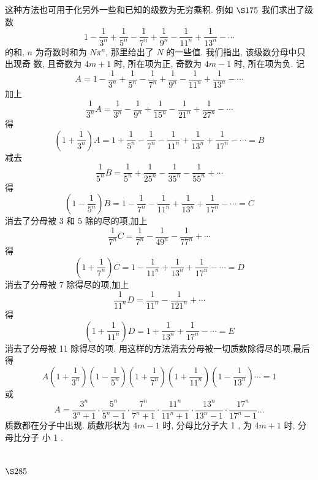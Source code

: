 这种方法也可用于化另外一些和已知的级数为无穷乘积. 例如 $\S 175$ 我们求出了级 数
\[
1-\frac{1}{3^{n}}+\frac{1}{5^{n}}-\frac{1}{7^{n}}+\frac{1}{9^{n}}-\frac{1}{11^{n}}+\frac{1}{13^{n}}-\cdots
\]
的和, $n$ 为奇数时和为 $N \pi^{n}$, 那里给出了 $N$ 的一些值. 我们指出, 该级数分母中只出现奇 数, 且奇数为 $4 m+1$ 时, 所在项为正, 奇数为 $4 m-1$ 时, 所在项为负. 记
\[
A=1-\frac{1}{3^{n}}+\frac{1}{5^{n}}-\frac{1}{7^{n}}+\frac{1}{9^{n}}-\frac{1}{11^{n}}+\frac{1}{13^{n}}-\cdots
\]
加上
\[
\frac{1}{3^{n}} A=\frac{1}{3^{n}}-\frac{1}{9^{n}}+\frac{1}{15^{n}}-\frac{1}{21^{n}}+\frac{1}{27^{n}}-\cdots
\]
得
\[
\left(1+\frac{1}{3^{n}}\right) A=1+\frac{1}{5^{n}}-\frac{1}{7^{n}}-\frac{1}{11^{n}}+\frac{1}{13^{n}}+\frac{1}{17^{n}}-\cdots=B
\]
减去
\[
\frac{1}{5^{n}} B=\frac{1}{5^{n}}+\frac{1}{25^{n}}-\frac{1}{35^{n}}-\frac{1}{55^{n}}+\cdots
\]
得
\[
\left(1-\frac{1}{5^{n}}\right) B=1-\frac{1}{7^{n}}-\frac{1}{11^{n}}+\frac{1}{13^{n}}+\frac{1}{17^{n}}-\cdots=C
\]
消去了分母被 3 和 5 除的尽的项,加上
\[
\frac{1}{7^{n}} C=\frac{1}{7^{n}}-\frac{1}{49^{n}}-\frac{1}{77^{n}}+\cdots
\]
得
\[
\left(1+\frac{1}{7^{n}}\right) C=1-\frac{1}{11^{n}}+\frac{1}{13^{n}}+\frac{1}{17^{n}}-\cdots=D
\]
消去了分母被 7 除得尽的项,加上
\[
\frac{1}{11^{n}} D=\frac{1}{11^{n}}-\frac{1}{121^{n}}+\cdots
\]
得
\[
\left(1+\frac{1}{11^{n}}\right) D=1+\frac{1}{13^{n}}+\frac{1}{17^{n}}-\cdots=E
\]
消去了分母被 11 除得尽的项. 用这样的方法消去分母被一切质数除得尽的项,最后得
\[
A\left(1+\frac{1}{3^{n}}\right)\left(1-\frac{1}{5^{n}}\right)\left(1+\frac{1}{7^{n}}\right)\left(1+\frac{1}{11^{n}}\right)\left(1-\frac{1}{13^{n}}\right) \cdots=1
\]
或
\[
A=\frac{3^{n}}{3^{n}+1} \cdot \frac{5^{n}}{5^{n}-1} \cdot \frac{7^{n}}{7^{n}+1} \cdot \frac{11^{n}}{11^{n}+1} \cdot \frac{13^{n}}{13^{n}-1} \cdot \frac{17^{n}}{17^{n}-1} \ldots
\]
质数都在分子中出现. 质数形状为 $4 m-1$ 时, 分母比分子大 1 , 为 $4 m+1$ 时, 分母比分子 小 1 .

\section{$\S 285$}


